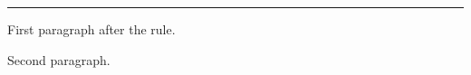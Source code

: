 %
%
\vsize=120pt
\hsize=4in
\hrule
\noindent First paragraph after the rule.
\par
\noindent Second paragraph.
\par
\eject
\bye

